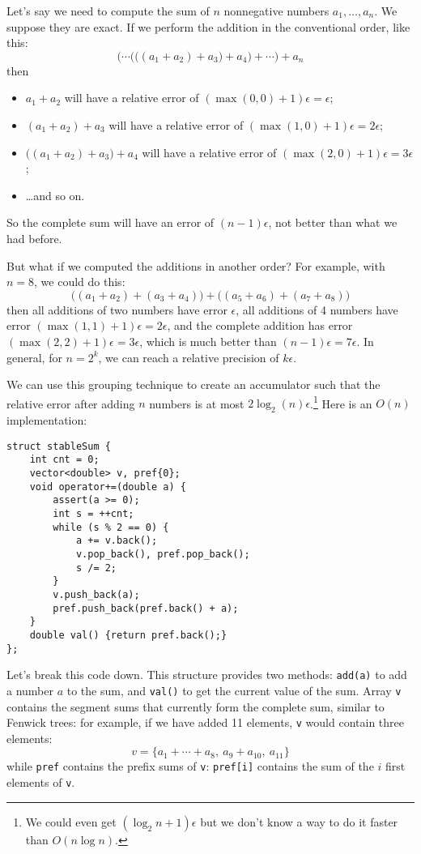 Let's say we need to compute the sum of $n$ nonnegative numbers $a_1,\ldots,a_n$. We suppose they are exact. If we perform the addition in the conventional order, like this:
\[\Bigg(\cdots\Big(\big((a_1+a_2)+a_3\big)+a_4\Big)+\cdots\Bigg)+a_n\]
then
\begin{itemize}
\item $a_1+a_2$ will have a relative error of $(\max(0,0)+1)\epsilon = \epsilon$;
\item $(a_1+a_2)+a_3$ will have a relative error of $(\max(1,0)+1)\epsilon = 2\epsilon$;
\item $\big((a_1+a_2)+a_3\big)+a_4$ will have a relative error of $(\max(2,0)+1)\epsilon = 3\epsilon$;
\item \ldots and so on.
\end{itemize}
So the complete sum will have an error of $(n-1)\epsilon$, not better than what we had before.

But what if we computed the additions in another order? For example, with $n=8$, we could do this:
\[\big((a_1+a_2)+(a_3+a_4)\big) + \big((a_5+a_6)+(a_7+a_8)\big)\]
then all additions of two numbers have error $\epsilon$, all additions of 4 numbers have error $(\max(1,1)+1)\epsilon = 2\epsilon$, and the complete addition has error $(\max(2,2)+1)\epsilon = 3\epsilon$, which is much better than $(n-1)\epsilon = 7\epsilon$. In general, for $n = 2^k$, we can reach a relative precision of $k\epsilon$.

We can use this grouping technique to create an accumulator such that the relative error after adding $n$ numbers is at most $2\log_2(n)\epsilon$.\footnote{We could even get $(\log_2{n}+1)\epsilon$ but we don't know a way to do it faster than $O(n\log n)$.} Here is an $O(n)$ implementation:
\begin{lstlisting}
struct stableSum {
    int cnt = 0;
    vector<double> v, pref{0};
    void operator+=(double a) {
        assert(a >= 0);
        int s = ++cnt;
        while (s % 2 == 0) {
            a += v.back();
            v.pop_back(), pref.pop_back();
            s /= 2;
        }
        v.push_back(a);
        pref.push_back(pref.back() + a);
    }
    double val() {return pref.back();}
};
\end{lstlisting}

Let's break this code down. This structure provides two methods: \lstinline|add(a)| to add a number $a$ to the sum, and \lstinline|val()| to get the current value of the sum. Array \lstinline|v| contains the segment sums that currently form the complete sum, similar to Fenwick trees: for example, if we have added 11 elements, \lstinline|v| would contain three elements:
\[v = \{a_1+\cdots+a_8,\ a_9+a_{10},\ a_{11}\}\]
while \lstinline|pref| contains the prefix sums of \lstinline|v|: \lstinline|pref[i]| contains the sum of the $i$ first elements of \lstinline|v|.

